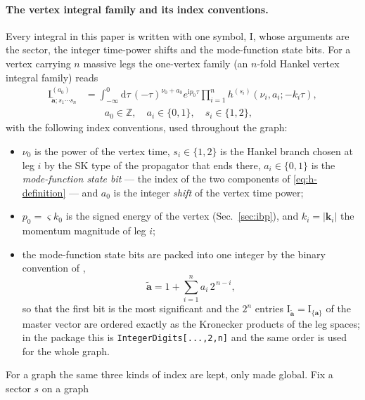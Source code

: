 \documentclass[11pt,a4paper]{article}
\numberwithin{table}{section}
\newcommand{\dd}{\mathrm d}
\newcommand{\ii}{\mathrm i}
\begin{document}
\paragraph{The vertex integral family and its index conventions.}
Every integral in this paper is written with one symbol, $\text{I}$, whose arguments are the sector,
the integer time-power shifts and the mode-function state bits. For a vertex carrying $n$ massive legs the
one-vertex family (an $n$-fold Hankel vertex integral family) reads
\begin{equation}
  \begin{aligned}
  \text{I}^{(a_0)}_{\tilde{\bm a};s_1\cdots s_n}
  &=\int_{-\infty}^0\dd\tau\,(-\tau)^{\nu_0+a_0}e^{\ii p_0\tau}
    \prod_{i=1}^{n}h^{(s_i)}(\nu_i,a_i;-k_i\tau),\\
  &\hspace{2em} a_0\in\mathbb Z,\quad a_i\in\{0,1\},\quad s_i\in\{1,2\},
  \end{aligned}
  \label{eq:vertex-integral-family}
\end{equation}
with the following index conventions, used throughout the graph:
\begin{itemize}
  \item $\nu_0$ is the power of the vertex time, $s_i\in\{1,2\}$ is the Hankel branch chosen at
        leg $i$ by the SK type of the propagator that ends there, $a_i\in\{0,1\}$ is the \emph{mode-function state bit}
        --- the index of the two components of \eqref{eq:h-definition} --- and $a_0$ is the integer
        \emph{shift} of the vertex time power;
  \item $p_0=\varsigma k_0$ is the signed energy of the vertex (Sec.~\ref{sec:ibp}), and
        $k_i=|\bm k_i|$ the momentum magnitude of leg $i$;
  \item the mode-function state bits are packed into one integer by the binary convention of \cite{Chen:2023iix},
  \begin{equation}
    \tilde{\bm a}=1+\sum_{i=1}^{n}a_i\,2^{\,n-i},
    \label{eq:binary-label}
  \end{equation}
  so that the first bit is the most significant and the $2^n$ entries
  $\text{I}_{\tilde{\bm a}}=\text{I}_{\{\bm a\}}$ of the master vector are ordered exactly as the
  Kronecker products of the leg spaces; in the package this is
  \texttt{IntegerDigits[...,2,n]} and the same order is used for the whole graph.
\end{itemize}
For a graph the same three kinds of index are kept, only made global. Fix a sector $s$ on a graph
\end{document}
